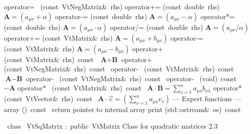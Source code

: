 \documentclass{article}
\begin{document}
\begin{cxxentry}
\begin{cxxclass}
\begin{cxxpublic}
        {}
\label{cxx.2.2.16}
        {operator=\ }
        {(const\ VtNegMatrix\&\ rhs)}
        {}
        {}
\label{cxx.2.2.17}
        {operator+=}
        {(const\ double\ rhs)}
        { $\textbf{A} = (a_{\mu\nu} + \alpha)$}
        {}
\label{cxx.2.2.18}
        {operator-=}
        {(const\ double\ rhs)}
        { $\textbf{A} = (a_{\mu\nu} - \alpha)$}
        {}
\label{cxx.2.2.19}
        {operator*=}
        {(const\ double\ rhs)}
        { $\textbf{A} = (a_{\mu\nu} \cdot\alpha)$}
        {}
\label{cxx.2.2.20}
        {operator/=}
        {(const\ double\ rhs)}
        { $\textbf{A} = (a_{\mu\nu} / \alpha)$}
        {}
\label{cxx.2.2.21}
        {operator+=}
        {(const\ VtMatrix\&\ rhs)}
        { $\textbf{A} = (a_{\mu\nu} + b_{\mu\nu})$}
        {}
\label{cxx.2.2.22}
        {operator-=}
        {(const\ VtMatrix\&\ rhs)}
        { $\textbf{A} = (a_{\mu\nu} - b_{\mu\nu})$}
        {}
\label{cxx.2.2.23}
        {operator+\ }
        {(const\ VtMatrix\&\ rhs)\ const\ }
        { $\textbf{A} + \textbf{B}$}
        {}
\label{cxx.2.2.24}
        {operator+\ }
        {(const\ VtNegMatrix\&\ rhs)\ const\ }
        {}
        {}
\label{cxx.2.2.25}
        {operator-\ }
        {(const\ VtMatrix\&\ rhs)\ const\ }
        { $\textbf{A} - \textbf{B}$}
        {}
\label{cxx.2.2.26}
        {operator-\ }
        {(const\ VtNegMatrix\&\ rhs)\ const\ }
        {}
        {}
\label{cxx.2.2.27}
        {operator-\ }
        {(void)\ const\ }
        { $-\textbf{A}$}
        {}
\label{cxx.2.2.28}
        {operator*\ }
        {(const\ VtMatrix\&\ rhs)\ const\ }
        { $\textbf{A}\cdot\textbf{B} = \sum_{\nu=1}^n a_{\mu\nu}b_{\nu\lambda}$}
        {}
\label{cxx.2.2.29}
        {operator*\ }
        {(const\ VtVector\&\ rhs)\ const\ }
        { $\textbf{A}\cdot\vec{v} = (\sum_{\nu=1}^n a_{\mu\nu}v_{\nu})$}
        {}
\label{cxx.2.2.30}
\cxxitem{}
        {--- Expert functions --- }
        {}
        {}
        {}
\label{cxx.2.2.31}
        {array}
        {()\ const\ }
        { return pointer to internal array}
        {}
\label{cxx.2.2.32}
        {print}
        {(std::ostream\&\ os)\ const\ }
        {}
        {}
\label{cxx.2.2.33}
\end{cxxpublic}
\end{cxxclass}
\begin{cxxclass}
{\ class\ }
        {VtSqMatrix}
        {:\ public\ VtMatrix}
        {Class for quadratic matrices}
        {2.3}
\begin{cxxInheritance}

\end{cxxInheritance}
\end{cxxclass}
\end{cxxentry}
\end{document}
